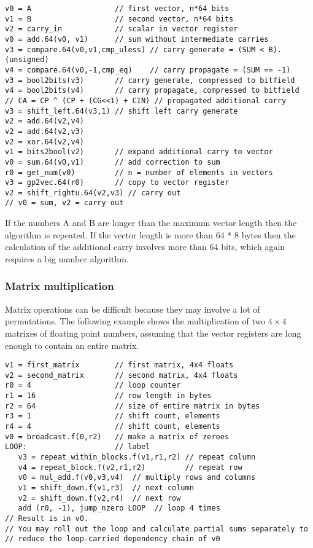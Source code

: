 \documentclass[forwardcom.tex]{subfiles}
\begin{document}
\begin{lstlisting}[frame=none]
v0 = A                   // first vector, n*64 bits
v1 = B                   // second vector, n*64 bits
v2 = carry_in            // scalar in vector register
v0 = add.64(v0, v1)      // sum without intermediate carries
v3 = compare.64(v0,v1,cmp_uless) // carry generate = (SUM < B). (unsigned)
v4 = compare.64(v0,-1,cmp_eq)    // carry propagate = (SUM == -1) 
v3 = bool2bits(v3)       // carry generate, compressed to bitfield
v4 = bool2bits(v4)       // carry propagate, compressed to bitfield
// CA = CP ^ (CP + (CG<<1) + CIN) // propagated additional carry
v3 = shift_left.64(v3,1) // shift left carry generate
v2 = add.64(v2,v4)
v2 = add.64(v2,v3)
v2 = xor.64(v2,v4)
v1 = bits2bool(v2)       // expand additional carry to vector
v0 = sum.64(v0,v1)       // add correction to sum
r0 = get_num(v0)         // n = number of elements in vectors
v3 = gp2vec.64(r0)       // copy to vector register
v2 = shift_rightu.64(v2,v3) // carry out
// v0 = sum, v2 = carry out
\end{lstlisting}
\vspace{2mm}

If the numbers A and B are longer than the maximum vector length then the algorithm is repeated. If the vector length is more than 64 * 8 bytes then the calculation of the additional carry involves more than 64 bits, which again requires a big number algorithm.

\subsubsection{Matrix multiplication} \label{matrixMultiplication}
Matrix operations can be difficult because they may involve a lot of permutations. The following example shows the multiplication of two $4\times4$ matrixes of floating point numbers, assuming that the vector registers are long enough to contain an entire matrix.

\vspace{2mm}

\begin{lstlisting}[frame=none]
v1 = first_matrix        // first matrix, 4x4 floats
v2 = second_matrix       // second matrix, 4x4 floats
r0 = 4                   // loop counter
r1 = 16                  // row length in bytes
r2 = 64                  // size of entire matrix in bytes
r3 = 1                   // shift count, elements
r4 = 4                   // shift count, elements
v0 = broadcast.f(0,r2)   // make a matrix of zeroes
LOOP:                    // label
   v3 = repeat_within_blocks.f(v1,r1,r2) // repeat column
   v4 = repeat_block.f(v2,r1,r2)         // repeat row
   v0 = mul_add.f(v0,v3,v4)  // multiply rows and columns
   v1 = shift_down.f(v1,r3)  // next column
   v2 = shift_down.f(v2,r4)  // next row
   add (r0, -1), jump_nzero LOOP  // loop 4 times
// Result is in v0.
// You may roll out the loop and calculate partial sums separately to
// reduce the loop-carried dependency chain of v0
\end{lstlisting}
\vspace{2mm}
\end{document}
